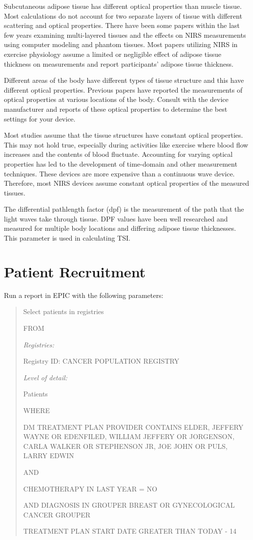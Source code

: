 \documentclass[
]{book}
\begin{document}
Subcutaneous adipose tissue has different optical properties than muscle tissue. Most calculations do not account for two separate layers of tissue with different scattering and optical properties. There have been some papers within the last few years examining multi-layered tissues and the effects on NIRS measurements using computer modeling and phantom tissues. Most papers utilizing NIRS in exercise physiology assume a limited or negligible effect of adipose tissue thickness on measurements and report participants' adipose tissue thickness.

Different areas of the body have different types of tissue structure and this have different optical properties. Previous papers have reported the measurements of optical properties at various locations of the body. Consult with the device manufacturer and reports of these optical properties to determine the best settings for your device.

Most studies assume that the tissue structures have constant optical properties. This may not hold true, especially during activities like exercise where blood flow increases and the contents of blood fluctuate. Accounting for varying optical properties has led to the development of time-domain and other measurement techniques. These devices are more expensive than a continuous wave device. Therefore, most NIRS devices assume constant optical properties of the measured tissues.

The differential pathlength factor (dpf) is the measurement of the path that the light waves take through tissue. DPF values have been well researched and measured for multiple body locations and differing adipose tissue thicknesses. This parameter is used in calculating TSI.

\hypertarget{PatientRecruitment}{%
\chapter{Patient Recruitment}\label{PatientRecruitment}}

Run a report in EPIC with the following parameters:

\begin{quote}
Select patients in registries

FROM

\emph{Registries:}

Registry ID: CANCER POPULATION REGISTRY

\emph{Level of detail:}

Patients

WHERE

DM TREATMENT PLAN PROVIDER CONTAINS ELDER, JEFFERY WAYNE OR EDENFILED, WILLIAM JEFFERY OR JORGENSON, CARLA WALKER OR STEPHENSON JR, JOE JOHN OR PULS, LARRY EDWIN

AND

CHEMOTHERAPY IN LAST YEAR = NO

AND DIAGNOSIS IN GROUPER BREAST OR GYNECOLOGICAL CANCER GROUPER

TREATMENT PLAN START DATE GREATER THAN TODAY - 14
\end{quote}
\end{document}
